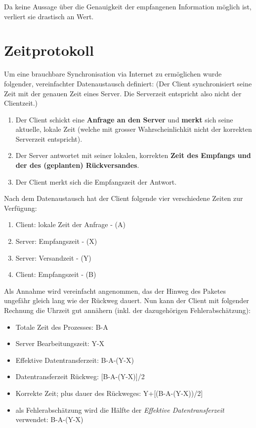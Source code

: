 Da keine Aussage über die Genauigkeit der empfangenen Information möglich ist, verliert sie drastisch an Wert.

\section{Zeitprotokoll}
Um eine brauchbare Synchronisation via Internet zu ermöglichen wurde folgender, vereinfachter Datenaustausch definiert: (Der Client synchronisiert seine Zeit mit der genauen Zeit eines Server. Die Serverzeit entspricht also nicht der Clientzeit.)\cite{stackoverflowNtp}



\begin{enumerate}
\item Der Client schickt eine \textbf{Anfrage an den Server} und \textbf{merkt} sich seine aktuelle, lokale Zeit (welche mit grosser Wahrscheinlichkit nicht der korrekten Serverzeit entspricht).
\item Der Server antwortet mit seiner lokalen, korrekten \textbf{Zeit des Empfangs und der des (geplanten) Rückversandes}.
\item Der Client merkt sich die Empfangszeit der Antwort. 
\end{enumerate}
\vspace{1em}
Nach dem Datenaustausch hat der Client folgende vier verschiedene Zeiten zur Verfügung:
\begin{enumerate}
\item Client: lokale Zeit der Anfrage - (A)
\item Server: Empfangszeit - (X)
\item Server: Versandzeit - (Y)
\item Client: Empfangszeit - (B)
\end{enumerate}
\vspace{1em}
Als Annahme wird vereinfacht angenommen, das der Hinweg des Paketes ungefähr gleich lang wie der Rückweg dauert.
\vspace{1em}
Nun kann der Client mit folgender Rechnung die Uhrzeit gut annähern (inkl. der dazugehörigen Fehlerabschätzung):
\begin{itemize}
\item Totale Zeit des Prozesses: B-A
\item Server Bearbeitungszeit: Y-X
\item Effektive Datentransferzeit: B-A-(Y-X)
\item Datentransferzeit Rückweg: [B-A-(Y-X)]/2
\item Korrekte Zeit; plus dauer des Rückweges: Y+[(B-A-(Y-X))/2]
\item als Fehlerabschätzung wird die Hälfte der \textit{Effektive Datentransferzeit} verwendet: B-A-(Y-X)
\end{itemize}


